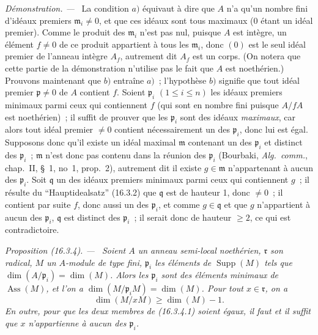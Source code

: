 \documentclass[10pt,oneside]{book}
\makeatletter
\newcommand{\setmanualcurrentlabel}[1]{\def\@currentlabel{#1}}
\newenvironment{proposition}[1][]{%
  \setmanualcurrentlabel{#1}\par\medskip\noindent\itshape Proposition (#1). ---\ }{\par}
\newenvironment{proof}{%
  \par\medskip\noindent\textit{Démonstration. ---\ }}{\par}
\makeatother
\begin{document}
\begin{proof}
La condition $a)$ équivaut à dire que $A$ n'a qu'un nombre fini d'idéaux
premiers $\mathfrak{m}_i\neq0$, et que ces idéaux sont tous maximaux ($0$ étant
un idéal premier). Comme le produit des $\mathfrak{m}_i$ n'est pas nul, puisque
$A$ est intègre, un élément $f\neq0$ de ce produit appartient à tous les
$\mathfrak{m}_i$, donc $(0)$ est le seul idéal premier de l'anneau intègre
$A_f$, autrement dit $A_f$ est un corps. (On notera que cette partie de la
démonstration n'utilise pas le fait que $A$ est noethérien.) Prouvons
maintenant que $b)$ entraîne $a)$~; l'hypothèse $b)$ signifie que tout idéal
premier $\mathfrak{p}\neq0$ de $A$ contient $f$. Soient $\mathfrak{p}_i$
$(1\leq i\leq n)$ les idéaux premiers minimaux parmi ceux qui contiennent $f$
(qui sont en nombre fini puisque $A/fA$ est noethérien)~; il suffit de prouver
que les $\mathfrak{p}_i$ sont des idéaux \emph{maximaux}, car alors tout idéal
premier $\neq0$ contient nécessairement un des $\mathfrak{p}_i$, donc lui est
égal. Supposons donc qu'il existe un idéal maximal $\mathfrak{m}$ contenant un
des $\mathfrak{p}_i$ et distinct des $\mathfrak{p}_i$~; $\mathfrak{m}$ n'est
donc pas contenu dans la réunion des $\mathfrak{p}_i$ (Bourbaki,
\emph{Alg.~comm.}, chap.~II, \S~1, no~1, prop.~2), autrement dit il existe
$g\in\mathfrak{m}$ n'appartenant à aucun des $\mathfrak{p}_i$. Soit
$\mathfrak{q}$ un des idéaux premiers minimaux parmi ceux qui contiennent
$g$~; il résulte du ``Hauptidealsatz'' (16.3.2) que $\mathfrak{q}$ est de
hauteur 1, donc $\neq0$~; il contient par suite $f$, donc aussi un des
$\mathfrak{p}_i$, et comme $g\in\mathfrak{q}$ et que $g$ n'appartient à aucun
des $\mathfrak{p}_i$, $\mathfrak{q}$ est distinct des $\mathfrak{p}_i$~; il
serait donc de hauteur $\geq2$, ce qui est contradictoire.
\end{proof}

\begin{proposition}[16.3.4]
\label{0.16.3.4-fr}
Soient $A$ un anneau semi-local noethérien, $\mathfrak{r}$ son radical, $M$ un
$A$-module de type fini, $\mathfrak{p}_i$ les éléments de
$\operatorname{Supp}(M)$ tels que
$\dim(A/\mathfrak{p}_i)=\dim(M)$. Alors les $\mathfrak{p}_i$ sont des éléments
minimaux de $\operatorname{Ass}(M)$, et l'on a
$\dim(M/\mathfrak{p}_iM)=\dim(M)$. Pour tout $x\in\mathfrak{r}$, on a
\begin{equation}
\label{0.16.3.4.1-fr}
\tag{16.3.4.1}
  \dim(M/xM)\geq\dim(M)-1.
\end{equation}
En outre, pour que les deux membres de (16.3.4.1) soient égaux, il faut et il
suffit que $x$ n'appartienne à aucun des $\mathfrak{p}_i$.
\end{proposition}
\end{document}
